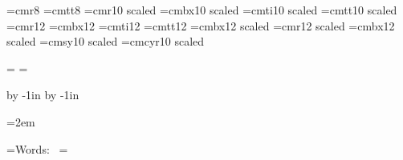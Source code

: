 








\font\small=cmr8
\font\smalltt=cmtt8
\font\medium=cmr10 scaled \magstephalf
\font\mediumbx=cmbx10 scaled \magstephalf
\font\mediumit=cmti10 scaled \magstephalf
\font\mediumtt=cmtt10 scaled \magstephalf
\font\large=cmr12
\font\largebx=cmbx12
\font\largeit=cmti12
\font\largett=cmtt12
\font\Largebx=cmbx12 scaled \magstephalf
\font\huge=cmr12 scaled 
\font\hugebx=cmbx12 scaled 
\font\mediumsy=cmsy10 scaled \magstephalf
\font\mediumcy=cmcyr10 scaled \magstephalf

\headline={}
\footline={}

\hsize=210mm
\vsize=297mm

\advance\voffset by -1in
\advance\hoffset by -1in

\newskip\titleskip
\titleskip=8pt

\newskip\basichskip
\basichskip=2em

\newskip\copyrightskip
\copyrightskip=6pt

\newskip\composerskip
\composerskip=4pt

\newdimen\wmdimen
{}=\hbox{{\large Words:  }}
\wmdimen=



